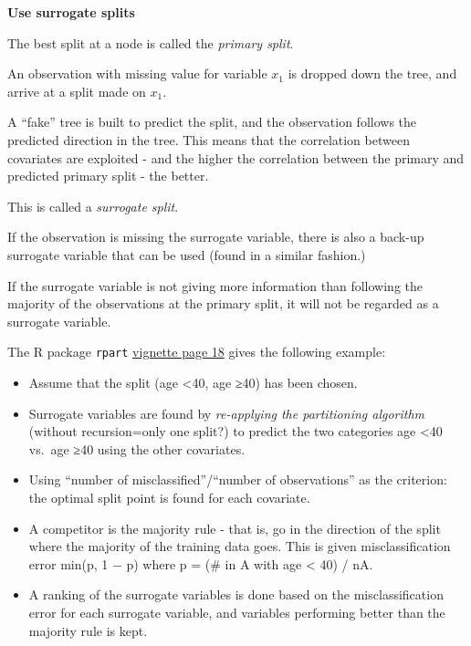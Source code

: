 \documentclass[
  ignorenonframetext,
]{beamer}
\providecommand{\tightlist}{%
  \setlength{\itemsep}{0pt}\setlength{\parskip}{0pt}}
\begin{document}
\begin{frame}

\textbf{Use surrogate splits}

The best split at a node is called the \emph{primary split}.

An observation with missing value for variable \(x_1\) is dropped down
the tree, and arrive at a split made on \(x_1\).

A ``fake'' tree is built to predict the split, and the observation
follows the predicted direction in the tree. This means that the
correlation between covariates are exploited - and the higher the
correlation between the primary and predicted primary split - the
better.

This is called a \emph{surrogate split}.

If the observation is missing the surrogate variable, there is also a
back-up surrogate variable that can be used (found in a similar
fashion.)

If the surrogate variable is not giving more information than following
the majority of the observations at the primary split, it will not be
regarded as a surrogate variable.

\end{frame}

\begin{frame}[fragile]

The R package \texttt{rpart}
\href{https://cran.r-project.org/web/packages/rpart/vignettes/longintro.pdf}{vignette
page 18} gives the following example:

\begin{itemize}
\tightlist
\item
  Assume that the split (age \textless40, age ≥40) has been chosen.
\item
  Surrogate variables are found by \emph{re-applying the partitioning
  algorithm} (without recursion=only one split?) to predict the two
  categories age \textless40 vs.~age ≥40 using the other covariates.
\item
  Using ``number of misclassified''/``number of observations'' as the
  criterion: the optimal split point is found for each covariate.
\item
  A competitor is the majority rule - that is, go in the direction of
  the split where the majority of the training data goes. This is given
  misclassification error min(p, 1 − p) where p = (\# in A with age
  \textless{} 40) / nA.
\item
  A ranking of the surrogate variables is done based on the
  misclassification error for each surrogate variable, and variables
  performing better than the majority rule is kept.
\end{itemize}

\end{frame}
\end{document}
